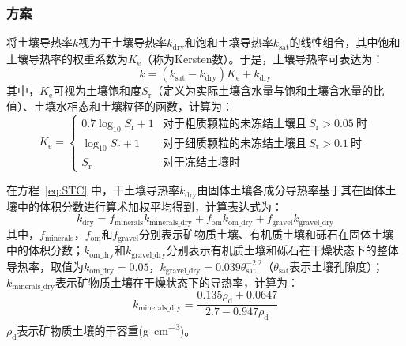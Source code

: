 \subsubsection{\citet{Johansen1975}方案}
\citet{Johansen1975}将土壤导热率$k$视为干土壤导热率$k_{\mathrm{dry}}$和饱和土壤导热率$k_{\mathrm{sat}}$的线性组合，其中饱和土壤导热率的权重系数为$K_{\mathrm {e}} $（称为Kersten数）。于是，土壤导热率可表达为：
\begin{equation}\label{eq:STC}
  k=(k_{\mathrm{sat}}-k_{\mathrm{dry}})K_{\mathrm {e}} +k_{\mathrm{dry}}
\end{equation}
其中，$K_{\mathrm {e}} $可视为土壤饱和度$S_{\mathrm {r}} $（定义为实际土壤含水量与饱和土壤含水量的比值）、土壤水相态和土壤粒径的函数，计算为：
\begin{equation}
  K_{\mathrm {e}} =\begin{cases}
    0.7\log_{10}S_{\mathrm {r}} +1 & \text {对于粗质颗粒的未冻结土壤且}\ S_{\mathrm {r}}>0.05\ \text {时} \\
    \log_{10}S_{\mathrm {r}} +1 & \text {对于细质颗粒的未冻结土壤且}\ S_{\mathrm {r}}>0.1\ \text {时} \\
    S_{\mathrm {r}}  & \text {对于冻结土壤时}
  \end{cases}
\end{equation}

在方程~\eqref{eq:STC} 中，干土壤导热率$k_{\mathrm{dry}}$由固体土壤各成分导热率基于其在固体土壤中的体积分数进行算术加权平均得到，计算表达式为：
\begin{equation}\label{eq:STC_dry}
  k_{\mathrm{dry}}=f_{\mathrm{minerals}}k_{\mathrm{minerals\_dry}}+f_{\mathrm{om}}k_{\mathrm{om\_dry}}+f_{\mathrm{gravel}}k_{\mathrm{gravel\_dry}}
\end{equation}
其中，$f_{\mathrm{minerals}}$，$f_{\mathrm{om}}$和$f_{\mathrm{gravel}}$分别表示矿物质土壤、有机质土壤和砾石在固体土壤中的体积分数；$k_{\mathrm{om\_dry}}$和$k_{\mathrm{gravel\_dry}}$分别表示有机质土壤和砾石在干燥状态下的整体导热率，取值为$k_{\mathrm{om\_dry}}=0.05$，$k_{\mathrm{gravel\_dry}}=0.039\theta_{\mathrm {sat}} ^{-2.2}$（$\theta_{\mathrm {sat}} $表示土壤孔隙度）；$k_{\mathrm{minerals\_dry}}$表示矿物质土壤在干燥状态下的导热率，计算为：$$k_{\mathrm{minerals\_dry}}=\frac{0.135\rho_{\mathrm {d}} +0.0647}{2.7-0.947\rho_{\mathrm {d}} }$$
$\rho_{\mathrm {d}} $表示矿物质土壤的干容重(\unit{g.cm^{-3}})。

